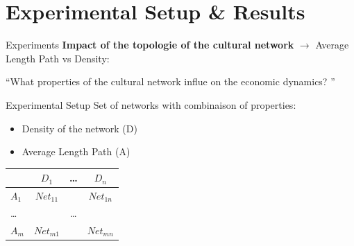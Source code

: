 \documentclass[12pt, handout=show,notes=show]{beamer}
\begin{document}
\section{Experimental Setup \& Results}
\begin{frame}{Experiments}
	\textbf{Impact of the topologie of the cultural network }
	$\rightarrow$ Average Length Path vs Density:\\
	\begin{center}
	    ``What properties of the cultural network influe on the economic dynamics? '' 
	\end{center}




\end{frame}

\begin{frame}{Experimental Setup}
	Set of networks with combinaison of properties:
	\begin{itemize}
	    \item Density of the network (D)
	    \item Average Length Path (A)
	\end{itemize}

    \begin{table}

	\centering
	\begin{tabular}{l|ccc}
	    	 	& $D_1$	 	& \dots & $D_n$		\\\hline
	    $A_1$	& $Net_{11}$	& 	& $Net_{1n}$	\\	
	    \dots	&		&\dots	&		\\
	    $A_m$	& $Net_{m1}$	& 	& $Net_{mn}$	\\	
	\end{tabular}
	\label{tab:net}
    \end{table}
\end{frame}
	 
\end{document}
